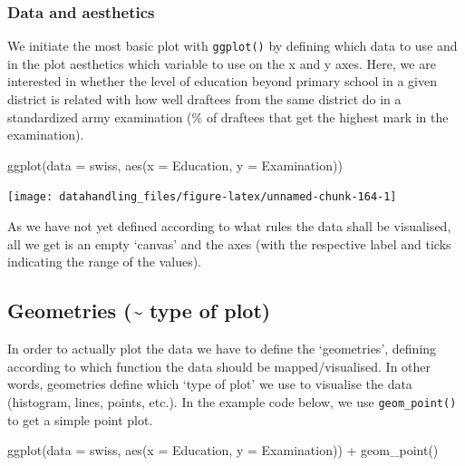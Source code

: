 \documentclass[
  12pt,
]{style/krantz}
\newenvironment{Shaded}{\begin{snugshade}}{\end{snugshade}}
\newcommand{\AttributeTok}[1]{\textcolor[rgb]{0.77,0.63,0.00}{#1}}
\newcommand{\FunctionTok}[1]{\textcolor[rgb]{0.00,0.00,0.00}{#1}}
\newcommand{\NormalTok}[1]{#1}
\newcommand{\SpecialCharTok}[1]{\textcolor[rgb]{0.00,0.00,0.00}{#1}}
\begin{document}
\hypertarget{data-and-aesthetics}{%
\subsubsection{Data and aesthetics}\label{data-and-aesthetics}}

We initiate the most basic plot with \texttt{ggplot()} by defining which data to use and in the plot aesthetics which variable to use on the x and y axes. Here, we are interested in whether the level of education beyond primary school in a given district is related with how well draftees from the same district do in a standardized army examination (\% of draftees that get the highest mark in the examination).

\begin{Shaded}
\begin{Highlighting}[]
\FunctionTok{ggplot}\NormalTok{(}\AttributeTok{data =}\NormalTok{ swiss, }\FunctionTok{aes}\NormalTok{(}\AttributeTok{x =}\NormalTok{ Education, }\AttributeTok{y =}\NormalTok{ Examination))}
\end{Highlighting}
\end{Shaded}

\texttt{[image: datahandling\_files/figure-latex/unnamed-chunk-164-1]}

As we have not yet defined according to what rules the data shall be visualised, all we get is an empty `canvas' and the axes (with the respective label and ticks indicating the range of the values).

\hypertarget{geometries-type-of-plot}{%
\subsection{Geometries (\textasciitilde{} type of plot)}\label{geometries-type-of-plot}}

In order to actually plot the data we have to define the `geometries', defining according to which function the data should be mapped/visualised. In other words, geometries define which `type of plot' we use to visualise the data (histogram, lines, points, etc.). In the example code below, we use \texttt{geom\_point()} to get a simple point plot.

\begin{Shaded}
\begin{Highlighting}[]
\FunctionTok{ggplot}\NormalTok{(}\AttributeTok{data =}\NormalTok{ swiss, }\FunctionTok{aes}\NormalTok{(}\AttributeTok{x =}\NormalTok{ Education, }\AttributeTok{y =}\NormalTok{ Examination)) }\SpecialCharTok{+} 
     \FunctionTok{geom\_point}\NormalTok{()}
\end{Highlighting}
\end{Shaded}
\end{document}
